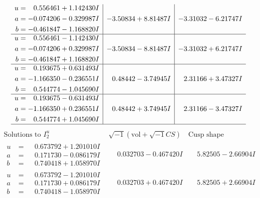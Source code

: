 \documentclass[1p]{elsarticle_modified}
\theoremstyle{definition}
\newcommand{\I}{\sqrt{-1}}
\begin{document}
$$\begin{array}{c|c|c}
\begin{aligned}
u &= \phantom{-}0.556461 + 1.142430 I \\
a &= -0.074206 - 0.329987 I \\
b &= -0.461847 - 1.168820 I\end{aligned}
 & -3.50834 + 8.81487 I & -3.31032 - 6.21747 I \\ \hline\begin{aligned}
u &= \phantom{-}0.556461 - 1.142430 I \\
a &= -0.074206 + 0.329987 I \\
b &= -0.461847 + 1.168820 I\end{aligned}
 & -3.50834 - 8.81487 I & -3.31032 + 6.21747 I \\ \hline\begin{aligned}
u &= \phantom{-}0.193675 + 0.631493 I \\
a &= -1.166350 - 0.236551 I \\
b &= \phantom{-}0.544774 - 1.045690 I\end{aligned}
 & \phantom{-}0.48442 - 3.74945 I & \phantom{-}2.31166 + 3.47327 I \\ \hline\begin{aligned}
u &= \phantom{-}0.193675 - 0.631493 I \\
a &= -1.166350 + 0.236551 I \\
b &= \phantom{-}0.544774 + 1.045690 I\end{aligned}
 & \phantom{-}0.48442 + 3.74945 I & \phantom{-}2.31166 - 3.47327 I\\
 \hline 
 \end{array}$$\newpage$$\begin{array}{c|c|c}  
\text{Solutions to }I^u_{2}& \I (\text{vol} + \sqrt{-1}CS) & \text{Cusp shape}\\
 \hline 
\begin{aligned}
u &= \phantom{-}0.673792 + 1.201010 I \\
a &= \phantom{-}0.171730 - 0.086179 I \\
b &= \phantom{-}0.740418 + 1.058970 I\end{aligned}
 & \phantom{-}0.032703 - 0.467420 I & \phantom{-}5.82505 - 2.66904 I \\ \hline\begin{aligned}
u &= \phantom{-}0.673792 - 1.201010 I \\
a &= \phantom{-}0.171730 + 0.086179 I \\
b &= \phantom{-}0.740418 - 1.058970 I\end{aligned}
 & \phantom{-}0.032703 + 0.467420 I & \phantom{-}5.82505 + 2.66904 I \\ \hline\begin{aligned}

\end{aligned}
\end{array}$$
\end{document}
